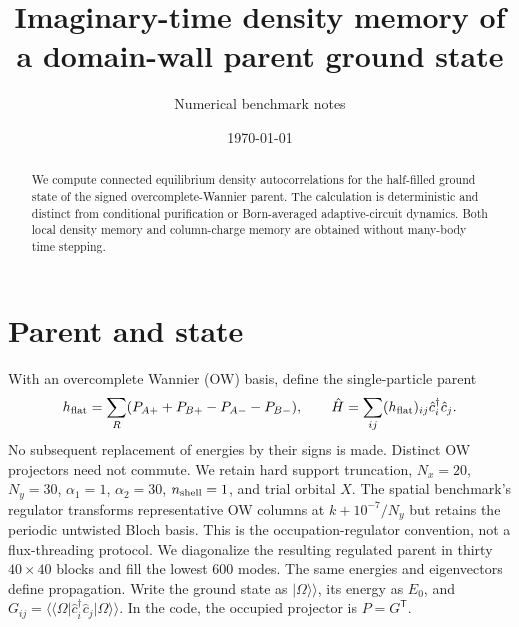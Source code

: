 \documentclass[aps,prb,onecolumn,nofootinbib,superscriptaddress]{revtex4-2}
\begin{document}
\title{Imaginary-time density memory of a domain-wall parent ground state}
\author{Numerical benchmark notes}
\date{\today}
\begin{abstract}
We compute connected equilibrium density autocorrelations for the half-filled
ground state of the signed overcomplete-Wannier parent. The calculation is
deterministic and distinct from conditional purification or Born-averaged
adaptive-circuit dynamics. Both local density memory and column-charge memory
are obtained without many-body time stepping.
\end{abstract}
\maketitle
\setcounter{tocdepth}{2}
\tableofcontents
\section{Parent and state}
With an overcomplete Wannier (OW) basis, define the single-particle parent
\begin{equation}
 h_{\rm flat}=\sum_R(P_{A+}+P_{B+}-P_{A-}-P_{B-}),\qquad
 \hat H=\sum_{ij}(h_{\rm flat})_{ij}\hat c_i^\dagger\hat c_j.
\end{equation}
No subsequent replacement of energies by their signs is made. Distinct OW
projectors need not commute. We retain hard support truncation, $N_x=20$,
$N_y=30$, $\alpha_1=1$, $\alpha_2=30$, $n_{\rm shell}=1$, and trial orbital $X$.
The spatial benchmark's regulator transforms representative OW columns at
$k+10^{-7}/N_y$ but retains the periodic untwisted Bloch basis. This is the
occupation-regulator convention, not a flux-threading protocol. We diagonalize
the resulting regulated parent in thirty $40\times40$ blocks and fill the
lowest 600 modes. The same energies and eigenvectors define propagation.
Write the ground state as $\lvert\Omega\rangle\!\rangle$, its energy as $E_0$,
and $G_{ij}=\langle\!\langle\Omega\rvert\hat c_i^\dagger\hat c_j
\lvert\Omega\rangle\!\rangle$. In the code, the occupied projector is $P=G^{\mathsf T}$.
\end{document}
